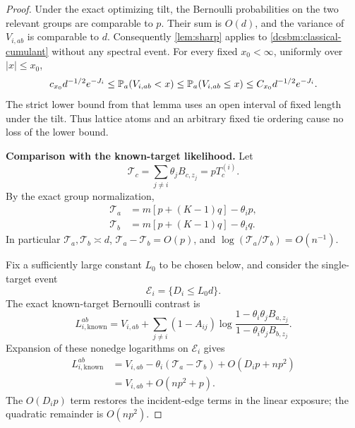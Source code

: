 \begin{proof}
Under the exact optimizing tilt, the Bernoulli probabilities on the
two relevant groups are comparable to \(p\). Their sum is \(O(d)\),
and the variance of \(V_{i,ab}\) is comparable to \(d\).
Consequently \cref{lem:sharp} applies to
\eqref{dcsbm:classical-cumulant} without any spectral event. For every
fixed \(x_0<\infty\), uniformly over \(|x|\le x_0\),
\begin{equation}
 c_{x_0}d^{-1/2}e^{-J_i}
 \le \mathbb P_a(V_{i,ab}<x)
 \le \mathbb P_a(V_{i,ab}\le x)
 \le C_{x_0}d^{-1/2}e^{-J_i}.
 \label{dcsbm:classical-count-tail}
\end{equation}
The strict lower bound from that lemma uses an open interval of fixed
length under the tilt. Thus lattice atoms and an arbitrary fixed
tie ordering cause no loss of the lower bound.

\medskip
\noindent\textbf{Comparison with the known-target likelihood.}
Let
\[
 \mathcal T_c=\sum_{j\ne i}\theta_j B_{c,z_j}
              =pT_c^{(i)}.
\]
By the exact group normalization,
\begin{equation}
 \begin{aligned}
 \mathcal T_a&=m[p+(K-1)q]-\theta_ip,\\
 \mathcal T_b&=m[p+(K-1)q]-\theta_iq.
 \end{aligned}
 \label{dcsbm:classical-exposure}
\end{equation}
In particular \(\mathcal T_a,\mathcal T_b\asymp d\),
\(\mathcal T_a-\mathcal T_b=O(p)\), and
\(\log(\mathcal T_a/\mathcal T_b)=O(n^{-1})\).

Fix a sufficiently large constant \(L_0\) to be chosen below, and consider
the single-target event
\[
 \mathcal E_i=\{D_i\le L_0d\}.
\]
The exact known-target Bernoulli contrast is
\[
 L^{ab}_{i,\mathrm{known}}
 =V_{i,ab}+
 \sum_{j\ne i}(1-A_{ij})
 \log\frac{1-\theta_i\theta_jB_{a,z_j}}
          {1-\theta_i\theta_jB_{b,z_j}} .
\]
Expansion of these nonedge logarithms on \(\mathcal E_i\) gives
\begin{align}
 L^{ab}_{i,\mathrm{known}}
 &=V_{i,ab}-\theta_i(\mathcal T_a-\mathcal T_b)
       +O(D_ip+np^2)\nonumber\\
 &=V_{i,ab}+O(np^2+p).
 \label{dcsbm:classical-known-contrast}
\end{align}
The \(O(D_ip)\) term restores the incident-edge terms in the linear
exposure; the quadratic remainder is \(O(np^2)\).


\end{proof}
